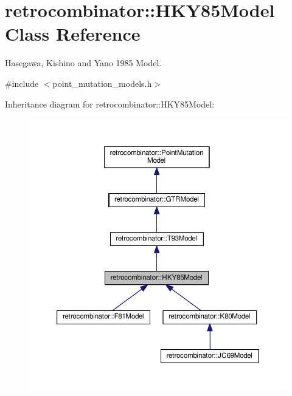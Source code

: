 \hypertarget{classretrocombinator_1_1HKY85Model}{}\section{retrocombinator\+:\+:H\+K\+Y85\+Model Class Reference}
\label{classretrocombinator_1_1HKY85Model}


Hasegawa, Kishino and Yano 1985 Model.  




{\ttfamily \#include $<$point\+\_\+mutation\+\_\+models.\+h$>$}



Inheritance diagram for retrocombinator\+:\+:H\+K\+Y85\+Model\+:
\nopagebreak
\begin{figure}[H]
\begin{center}
\leavevmode
\includegraphics[width=350pt]{classretrocombinator_1_1HKY85Model__inherit__graph}
\end{center}
\end{figure}


